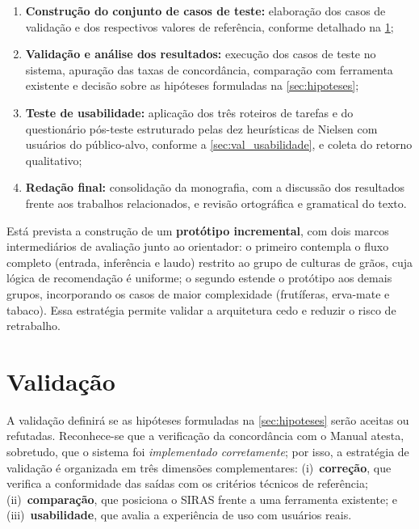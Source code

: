 \begin{enumerate}[label=\alph*),leftmargin=3em]
  \item \textbf{Construção do conjunto de casos de teste:} elaboração
    dos casos de validação e dos respectivos valores de referência,
    conforme detalhado na \cref{sec:validacao};

  \item \textbf{Validação e análise dos resultados:} execução dos casos
    de teste no sistema, apuração das taxas de concordância, comparação
    com ferramenta existente e decisão sobre as hipóteses formuladas na
    \cref{sec:hipoteses};

  \item \textbf{Teste de usabilidade:} aplicação dos três roteiros de
    tarefas e do questionário pós-teste estruturado pelas dez heurísticas
    de Nielsen com usuários do público-alvo, conforme a
    \cref{sec:val_usabilidade}, e coleta do retorno qualitativo;

  \item \textbf{Redação final:} consolidação da monografia, com a
    discussão dos resultados frente aos trabalhos relacionados, e
    revisão ortográfica e gramatical do texto.

\end{enumerate}

Está prevista a construção de um \textbf{protótipo incremental}, com dois
marcos intermediários de avaliação junto ao orientador: o primeiro
contempla o fluxo completo (entrada, inferência e laudo) restrito ao
grupo de culturas de grãos, cuja lógica de recomendação é uniforme; o
segundo estende o protótipo aos demais grupos, incorporando os casos de
maior complexidade (frutíferas, erva-mate e tabaco). Essa estratégia
permite validar a arquitetura cedo e reduzir o risco de retrabalho.

\section{Validação}\label{sec:validacao}

A validação definirá se as hipóteses formuladas na \cref{sec:hipoteses}
serão aceitas ou refutadas. Reconhece-se que a verificação da
concordância com o Manual atesta, sobretudo, que o sistema foi
\emph{implementado corretamente}; por isso, a estratégia de validação é
organizada em três dimensões complementares: (i)~\textbf{correção}, que
verifica a conformidade das saídas com os critérios técnicos de
referência; (ii)~\textbf{comparação}, que posiciona o SIRAS frente a uma
ferramenta existente; e (iii)~\textbf{usabilidade}, que avalia a
experiência de uso com usuários reais.

